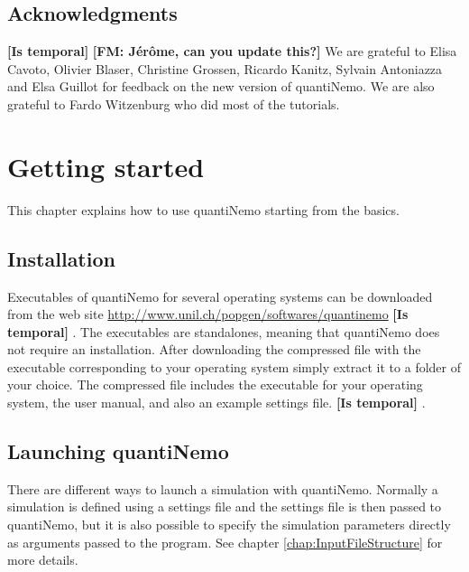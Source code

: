 \documentclass[letterpaper,12pt,oneside]{book}
\newcommand{\fm}[1]{\small {\bf \color{blue} [FM:  #1]} \normalsize}
\newcommand{\tbc}[1]{\small {\bf \color{red} [Is temporal]} \normalsize} %
\begin{document}
\section{Acknowledgments}
\tbc{}\fm{Jérôme, can you update this?}
We are grateful to Elisa Cavoto, Olivier Blaser, Christine Grossen, Ricardo Kanitz, Sylvain Antoniazza and Elsa Guillot for feedback on the new version of quantiNemo. We are also grateful to Fardo Witzenburg who did most of the tutorials.




\newpage
\chapter{Getting started}
\label{chap:GettingStarted}
This chapter explains how to use quantiNemo starting from the basics. 


\section{Installation}
Executables of quantiNemo for several operating systems can be downloaded from the web site \url{http://www.unil.ch/popgen/softwares/quantinemo} \tbc{}. The executables are standalones, meaning that quantiNemo does not require an installation. After downloading the compressed file with the executable corresponding to your operating system simply extract it to a folder of your choice. The compressed file includes the executable for your operating system, the user manual, and also an example settings file.\tbc{}.


\section{Launching quantiNemo}\label{launchQuantiNemo}
There are different ways to launch a simulation with quantiNemo. Normally a simulation is defined using a settings file and the settings file is then passed to quantiNemo, but it is also possible to specify the simulation parameters directly as arguments passed to the program. See chapter \ref{chap:InputFileStructure} for more details. 
\end{document}
